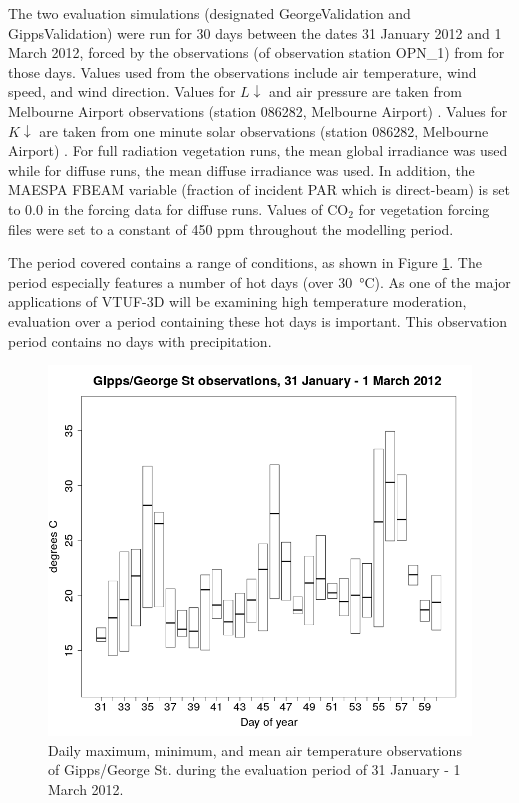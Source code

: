 \documentclass[final,3p,times,authoryear]{elsarticle}
\begin{document}
The two evaluation simulations (designated GeorgeValidation and GippsValidation) were run for 30 days between the dates 31 January 2012 and 1 March 2012, forced by the observations (of observation station OPN\_1) from \cite{Coutts2015} for those days. Values used from the observations include air temperature, wind speed, and wind direction. Values for $L\downarrow$ and air pressure are taken from Melbourne Airport observations (station 086282, Melbourne Airport) \citep{BOM2016b}. Values for $K\downarrow$ are taken from one minute solar observations (station 086282, Melbourne Airport) \citep{BOM2016}.  For full radiation vegetation runs, the mean global irradiance was used while for diffuse runs, the mean diffuse irradiance was used. In addition, the MAESPA FBEAM variable (fraction of incident PAR which is direct-beam) is set to 0.0 in the forcing data for diffuse runs. Values of CO$_{2}$ for vegetation forcing files were set to a constant of 450 ppm throughout the modelling period.

The period covered contains a range of conditions, as shown in Figure \ref{fig:CoMtemp}. The period especially features a number of hot days (over 30\SI{}{\degreeCelsius}). As one of the major applications of VTUF-3D will be examining high temperature moderation, evaluation over a period containing these hot days is important. This observation period contains no days with precipitation.

\begin{figure}[!htbp]
\includegraphics[trim = 0mm 0mm 0mm 0mm, clip, scale=0.30]{images/CoMTempFeb2012.png}
\caption{Daily maximum, minimum, and mean air temperature observations of Gipps/George St. during the evaluation period of 31 January - 1 March 2012.\label{fig:CoMtemp}} 
\end{figure}
\end{document}
